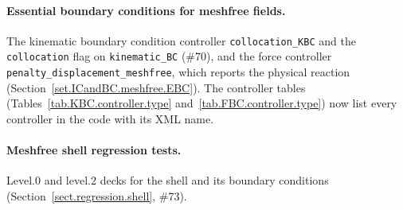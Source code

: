 \paragraph{Essential boundary conditions for meshfree fields.}
The kinematic boundary condition controller \texttt{collocation\_KBC} and the \texttt{collocation}
flag on \texttt{kinematic\_BC} (\#70), and the force controller
\texttt{penalty\_displacement\_meshfree}, which reports the physical reaction
(Section~\ref{set.ICandBC.meshfree.EBC}). The controller tables
(Tables~\ref{tab.KBC.controller.type} and~\ref{tab.FBC.controller.type}) now list every controller
in the code with its XML name.

\paragraph{Meshfree shell regression tests.}
Level.0 and level.2 decks for the shell and its boundary conditions
(Section~\ref{sect.regression.shell}, \#73).
